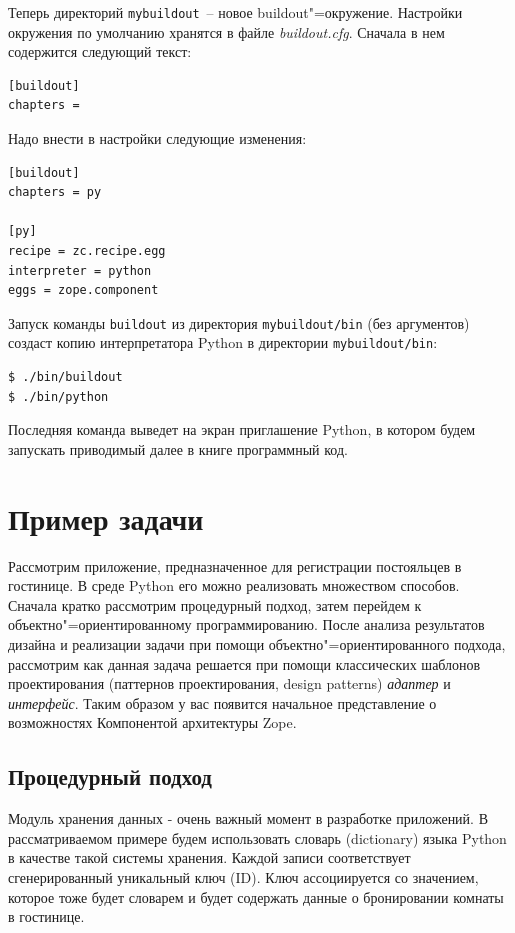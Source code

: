 \documentclass[a4paper,openany,twoside,draft]{book}
\providecommand*{\DUroletitlereference}[1]{\textsl{#1}}
\begin{document}
Теперь директорий \texttt{mybuildout}~-- новое buildout"=окружение.  Настройки окружения по умолчанию хранятся в файле \DUroletitlereference{buildout.cfg}.  Сначала в нем содержится следующий текст:

\begin{verbatim}
[buildout]
chapters =
\end{verbatim}

Надо внести в настройки следующие изменения:

\begin{verbatim}
[buildout]
chapters = py

[py]
recipe = zc.recipe.egg
interpreter = python
eggs = zope.component
\end{verbatim}

Запуск команды \texttt{buildout} из директория \texttt{mybuildout/bin} (без аргументов) создаст копию интерпретатора Python в директории \texttt{mybuildout/bin}:

\begin{verbatim}
$ ./bin/buildout
$ ./bin/python
\end{verbatim}

Последняя команда выведет на экран приглашение Python, в котором
будем запускать приводимый далее в книге программный код.


\chapter{Пример задачи%
  \label{id17}%
}


Рассмотрим приложение, предназначенное для регистрации постояльцев в гостинице.  В среде Python его можно реализовать множеством способов.  Сначала кратко рассмотрим процедурный подход, затем перейдем к объектно"=ориентированному программированию.  После анализа результатов дизайна и реализации задачи при помощи объектно"=ориентированного подхода, рассмотрим как данная задача решается при помощи классических шаблонов проектирования (паттернов проектирования, design patterns) \DUroletitlereference{адаптер} и \DUroletitlereference{интерфейс}.  Таким образом у вас появится начальное представление о возможностях Компонентой архитектуры Zope.


\section{Процедурный подход%
  \label{id19}%
}

Модуль хранения данных - очень важный момент в разработке приложений.  В рассматриваемом примере будем использовать словарь (dictionary) языка Python в качестве такой системы хранения.  Каждой записи соответствует сгенерированный уникальный ключ (ID).  Ключ ассоциируется со значением, которое тоже будет словарем и будет содержать данные о бронировании комнаты в гостинице.
\end{document}
